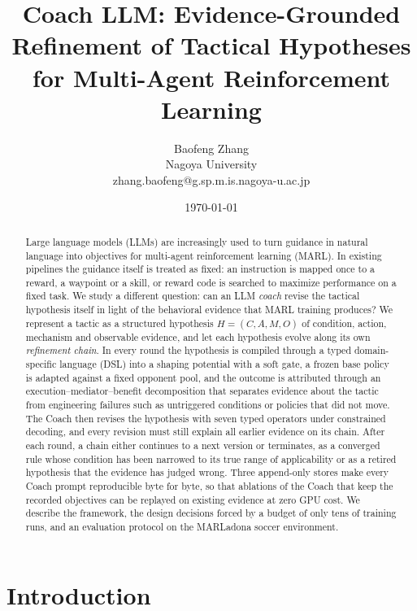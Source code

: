 \documentclass[11pt]{article}
\title{\textbf{Coach LLM: Evidence-Grounded Refinement of Tactical Hypotheses\\for Multi-Agent Reinforcement Learning}}
\author{Baofeng Zhang\\[2pt]\small Nagoya University\\\small zhang.baofeng@g.sp.m.is.nagoya-u.ac.jp}
\date{\today}
\begin{document}
\maketitle

\begin{abstract}
Large language models (LLMs) are increasingly used to turn guidance in natural language into objectives for multi-agent reinforcement learning (MARL).
In existing pipelines the guidance itself is treated as fixed: an instruction is mapped once to a reward, a waypoint or a skill, or reward code is searched to maximize performance on a fixed task.
We study a different question: can an LLM \emph{coach} revise the tactical hypothesis itself in light of the behavioral evidence that MARL training produces?
We represent a tactic as a structured hypothesis $H=(C,A,M,O)$ of condition, action, mechanism and observable evidence, and let each hypothesis evolve along its own \emph{refinement chain}.
In every round the hypothesis is compiled through a typed domain-specific language (DSL) into a shaping potential with a soft gate, a frozen base policy is adapted against a fixed opponent pool, and the outcome is attributed through an execution--mediator--benefit decomposition that separates evidence about the tactic from engineering failures such as untriggered conditions or policies that did not move.
The Coach then revises the hypothesis with seven typed operators under constrained decoding, and every revision must still explain all earlier evidence on its chain.
After each round, a chain either continues to a next version or terminates, as a converged rule whose condition has been narrowed to its true range of applicability or as a retired hypothesis that the evidence has judged wrong.
Three append-only stores make every Coach prompt reproducible byte for byte, so that ablations of the Coach that keep the recorded objectives can be replayed on existing evidence at zero GPU cost.
We describe the framework, the design decisions forced by a budget of only tens of training runs, and an evaluation protocol on the MARLadona soccer environment.
\end{abstract}

\section{Introduction}
\label{sec:intro}
\end{document}
